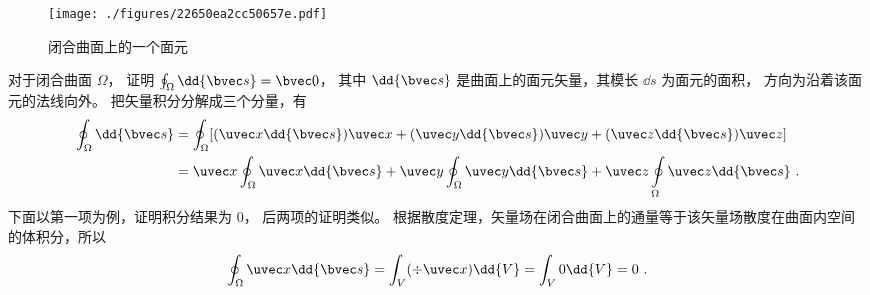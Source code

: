 
\begin{issues}
\issueDraft
\end{issues}




\begin{figure}[ht]
\centering
\texttt{[image: ./figures/22650ea2cc50657e.pdf]}
\caption{闭合曲面上的一个面元} \label{fig_CSI0_1}
\end{figure}

对于闭合曲面 $\Omega$，  证明 $\oint_\Omega  \dd{\bvec s} = \bvec 0$， 其中 $\dd{\bvec s}$ 是曲面上的面元矢量，其模长 $\dd{s}$ 为面元的面积，  方向为沿着该面元的法线向外。
把矢量积分分解成三个分量，有
\begin{equation}
\begin{aligned}
\oint_\Omega  \dd{\bvec s} & = \oint_\Omega  [(\uvec x \dd{\bvec s})\uvec x + (\uvec y \dd{\bvec s})\uvec y + (\uvec z \dd{\bvec s})\uvec z] \\
&= \uvec x\oint_\Omega  \uvec x \dd{\bvec s}  + \uvec y\oint_\Omega \uvec y \dd{\bvec s} + \uvec z\oint\limits_\Omega \uvec z \dd{\bvec s}~.
\end{aligned}
\end{equation}
下面以第一项为例，证明积分结果为 0， 后两项的证明类似。
根据散度定理，矢量场在闭合曲面上的通量等于该矢量场散度在曲面内空间的体积分，所以
\begin{equation}
\oint_\Omega  \uvec x \dd{\bvec s}  = \int_V (\div \uvec x) \dd{V}  = \int_V 0 \dd{V}  = 0~.
\end{equation}
